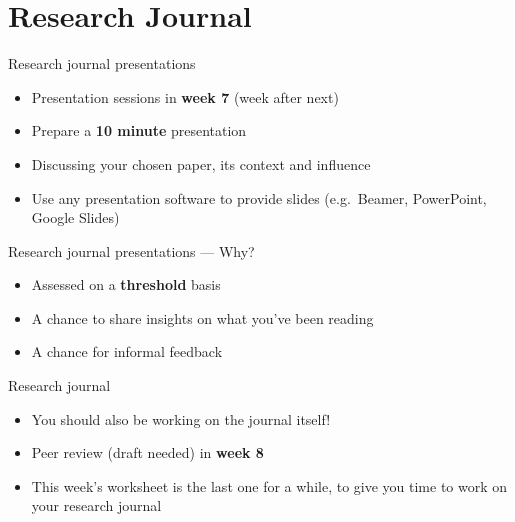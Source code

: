 \part{Research Journal}
\frame{\partpage}

\begin{frame}{Research journal presentations}
    \begin{itemize}
        \pause\item Presentation sessions in \textbf{week 7} (week after next)
        \pause\item Prepare a \textbf{10 minute} presentation
        \pause\item Discussing your chosen paper, its context and influence
        \pause\item Use any presentation software to provide slides (e.g.\ Beamer, PowerPoint, Google Slides)
    \end{itemize}
\end{frame}

\begin{frame}{Research journal presentations --- Why?}
    \begin{itemize}
        \pause\item Assessed on a \textbf{threshold} basis
        \pause\item A chance to share insights on what you've been reading
        \pause\item A chance for informal feedback
    \end{itemize}
\end{frame}

\begin{frame}{Research journal}
    \begin{itemize}
        \pause\item You should also be working on the journal itself!
        \pause\item Peer review (draft needed) in \textbf{week 8}
        \pause\item This week's worksheet is the last one for a while, to give you time to work on your research journal
    \end{itemize}
\end{frame}
